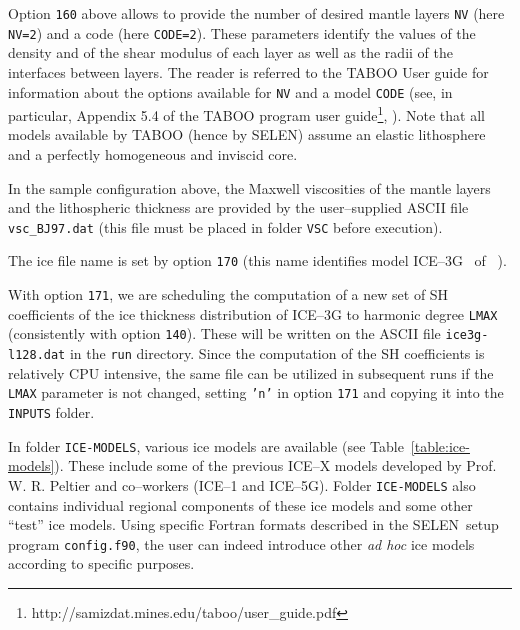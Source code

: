 \documentclass[11pt,fleqn,a4paper,titlepage]{article}
\newcommand\selen{\textsf{SELEN~}}
\newcommand\selens{\textsf{SELEN}}
\begin{document}
Option \texttt{160} above allows to provide the number 
of desired mantle layers \texttt{NV} (here \texttt{NV=2}) and a code (here \texttt{CODE=2}).
These parameters identify the values of the density and of the shear modulus of each layer 
as well as the radii of the interfaces between layers. The reader is referred to the TABOO 
User guide for information about the options available for \texttt{NV} and a model 
\texttt{CODE} (see, in particular, Appendix 5.4 of the TABOO program 
user guide\footnote{http://samizdat.mines.edu/taboo/user\_guide.pdf}, \citeauthor{Spada-2003b} 
\citeyear{Spada-2003b}). 
Note that all models available by TABOO (hence by \selens) assume an elastic lithosphere and a 
perfectly homogeneous and inviscid core. 

In the sample configuration above, the Maxwell viscosities of the mantle layers and the lithospheric 
thickness are 
provided by the user--supplied ASCII file \texttt{vsc\_BJ97.dat} (this file must be 
placed in folder \texttt{VSC} before execution).


\vspace{0.4cm}

{\color{Cyan}{\scriptsize\begin{verbatim}
    ...
    ====> ICE MODEL ---------------------------------------------------------------
    170    Ice file name                               'ice3g.dat'  
    171    Prepare a new SH ice file (y/n, filename)       'y'  'ice3g-l128.dat'
    172    Ice history time step (kyrs)                       '1.0'  
    ...
\end{verbatim} }}
\noindent The ice file name is set by option \texttt{170} (this 
name identifies model ICE--3G~ of \citeauthor{Tushingham_and_Peltier_1991}~\citeyear{Tushingham_and_Peltier_1991}). 

With option \texttt{171}, we are scheduling the computation of a new set of SH coefficients of the 
ice thickness distribution of ICE--3G to harmonic degree \texttt{LMAX} (consistently
with option \texttt{140}). These will be written on the ASCII 
file \texttt{ice3g-l128.dat} in the \texttt{run} directory. Since the computation 
of the SH coefficients is relatively CPU intensive, the same file can be 
utilized in subsequent runs if the \texttt{LMAX} parameter
is not changed, setting \texttt{'n'} in option \texttt{171} and copying it into the \texttt{INPUTS} folder. 

In folder \texttt{ICE-MODELS}, various ice models are available 
(see Table~\ref{table:ice-models}). These include some of the 
previous ICE--X models developed by Prof. W. R. Peltier and co--workers (ICE--1 and ICE--5G).  
Folder \texttt{ICE-MODELS} also contains individual regional components of these ice models and 
some other ``test'' ice models. Using specific {Fortran} formats described in the \selen setup 
program \texttt{config.f90}, the user can indeed introduce other \textit{ad hoc} ice models 
according to specific purposes.
\end{document}
